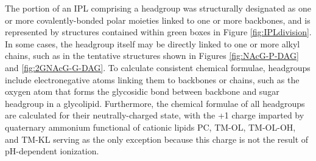 

The portion of an IPL comprising a headgroup was structurally designated as one or more covalently-bonded polar moieties linked to one or more backbones, and is represented by structures contained within green boxes in Figure \ref{fig:IPLdivision}. In some cases, the headgroup itself may be directly linked to one or more alkyl chains, such as in the tentative structures shown in Figures \ref{fig:NAcG-P-DAG} and \ref{fig:2GNAcG-G-DAG}. To calculate consistent chemical formulae, headgroups include electronegative atoms linking them to backbones or chains, such as the oxygen atom that forms the glycosidic bond between backbone and sugar headgroup in a glycolipid. Furthermore, the chemical formulae of all headgroups are calculated for their neutrally-charged state, with the +1 charge imparted by quaternary ammonium functional of cationic lipids PC, TM-OL, TM-OL-OH, and TM-KL serving as the only exception because this charge is not the result of pH-dependent ionization.

